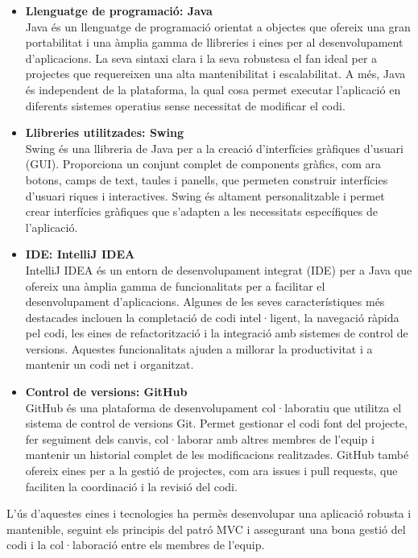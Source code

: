 \documentclass{ieeetj}
\begin{document}
\begin{itemize}
    \item \textbf{Llenguatge de programació: Java} \\
    Java és un llenguatge de programació orientat a objectes que ofereix una gran portabilitat i una àmplia gamma de llibreries i eines per al desenvolupament d'aplicacions. La seva sintaxi clara i la seva robustesa el fan ideal per a projectes que requereixen una alta mantenibilitat i escalabilitat. A més, Java és independent de la plataforma, la qual cosa permet executar l'aplicació en diferents sistemes operatius sense necessitat de modificar el codi.

    \item \textbf{Llibreries utilitzades: Swing} \\
    Swing és una llibreria de Java per a la creació d'interfícies gràfiques d'usuari (GUI). Proporciona un conjunt complet de components gràfics, com ara botons, camps de text, taules i panells, que permeten construir interfícies d'usuari riques i interactives. Swing és altament personalitzable i permet crear interfícies gràfiques que s'adapten a les necessitats específiques de l'aplicació.

    \item \textbf{IDE: IntelliJ IDEA} \\
    IntelliJ IDEA és un entorn de desenvolupament integrat (IDE) per a Java que ofereix una àmplia gamma de funcionalitats per a facilitar el desenvolupament d'aplicacions. Algunes de les seves característiques més destacades inclouen la completació de codi intel·ligent, la navegació ràpida pel codi, les eines de refactorització i la integració amb sistemes de control de versions. Aquestes funcionalitats ajuden a millorar la productivitat i a mantenir un codi net i organitzat.

    \item \textbf{Control de versions: GitHub} \\
    GitHub és una plataforma de desenvolupament col·laboratiu que utilitza el sistema de control de versions Git. Permet gestionar el codi font del projecte, fer seguiment dels canvis, col·laborar amb altres membres de l'equip i mantenir un historial complet de les modificacions realitzades. GitHub també ofereix eines per a la gestió de projectes, com ara issues i pull requests, que faciliten la coordinació i la revisió del codi.
\end{itemize}

L'ús d'aquestes eines i tecnologies ha permès desenvolupar una aplicació robusta i mantenible, seguint els principis del patró MVC i assegurant una bona gestió del codi i la col·laboració entre els membres de l'equip.
\end{document}
